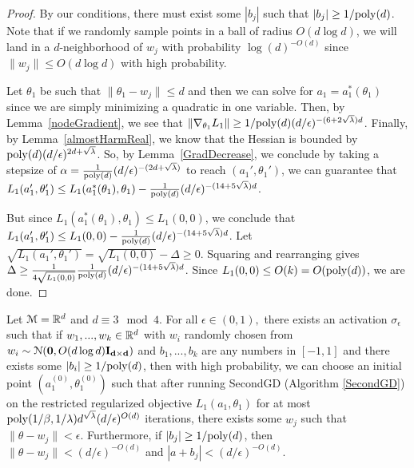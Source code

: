 \begin{proof}
By our conditions, there must exist some $|b_j|$ such that $|b_j| \geq 1/\mathrm{poly}(d)$. Note that if we randomly sample points in a ball of radius $O(d\log d)$, we will land in a $d$-neighborhood of $w_j$ with probability $\log(d)^{-O(d)}$ since $\|w_j\|\leq O(d\log d)$ with high probability. 

Let $\theta_1$ be such that $\|\theta_1 - w_j \| \leq d$ and then we can solve for $a_1 = a_1^*(\theta_1)$ since we are simply minimizing a quadratic in one variable. Then, by Lemma~\ref{nodeGradient}, we see that $\|\nabla_{\theta_1}L_1 \| \geq 1/\mathrm{poly}(d)(d/\epsilon)^{-(6+2\sqrt{\lambda})d}$. Finally, by Lemma~\ref{almostHarmReal}, we know that the Hessian is bounded by $\mathrm{poly}(d)(d/\epsilon)^{2d + \sqrt{\lambda}}$. So, by Lemma~\ref{GradDecrease}, we conclude by taking a stepsize of $\alpha = \frac{1}{\mathrm{poly}(d)}(d/\epsilon)^{-(2d + \sqrt{\lambda})}$ to reach $(a_1',\theta_1')$, we can guarantee that $L_1(a_1', \theta_1') \leq L_1 (a_1^*(\theta_1), \theta_1) - \frac{1}{\mathrm{poly}(d)} (d/\epsilon)^{ -(14+5\sqrt{\lambda})d}$.

But since $L_1(a_1^*(\theta_1),\theta_1)\leq L_1(0,0)$, we conclude that $L_1(a_1', \theta_1') \leq L_1(0,0) -  \frac{1}{\mathrm{poly}(d)} (d/\epsilon)^{ -(14+5\sqrt{\lambda})d}$. Let $\sqrt{L_1(a_1', \theta_1')} = \sqrt{L_1(0,0)} - \Delta \geq 0$. Squaring and rearranging gives $\Delta \geq \frac{1}{4\sqrt{L_1( 0, 0)}}  \frac{1}{\mathrm{poly}(d)}(d/\epsilon)^{ -(14+5\sqrt{\lambda})d} $. Since $L_1(0,0) \leq O(k) = O(\mathrm{poly}(d))$, we are done. 

\end{proof}
%
\begin{lemma}\label{nodewiseSGD}
Let $\mathcal{M} = {\mathbb{R}}^{d}$ and $d\equiv 3 \mod 4$. For all $\epsilon \in (0,1),$ there exists an activation $\sigma_\epsilon$ such that if $w_1,...,w_k \in {\mathbb{R}}^d$ with $w_i$ randomly chosen from $w_i \sim  \mathcal{N}({\bf 0}, O(d\log d){\bf I_{d\times d}})$ and $b_1,...,b_k$ are any numbers in $[-1,1]$ and there exists some $|b_i| \geq 1/\mathrm{poly}(d)$, then with high probability, we can choose an initial point $(a_1^{(0)}, \theta_1^{(0)})$ such that after running SecondGD (Algorithm \ref{SecondGD}) on the restricted regularized objective $L_1(a_1,\theta_1)$ for at most $\mathrm{poly}(1/\beta,1/\lambda)d^{\sqrt{\lambda}}(d/\epsilon)^{O(d)}$ iterations, there exists some $w_j$ such that $\|\theta - w_j\| < \epsilon$. Furthermore, if $|b_j| \geq 1/\mathrm{poly}(d)$, then $\|\theta - w_j\| < (d/\epsilon)^{-O(d)}$ and $|a + b_j| < (d/\epsilon)^{-O(d)}$.
\end{lemma}


